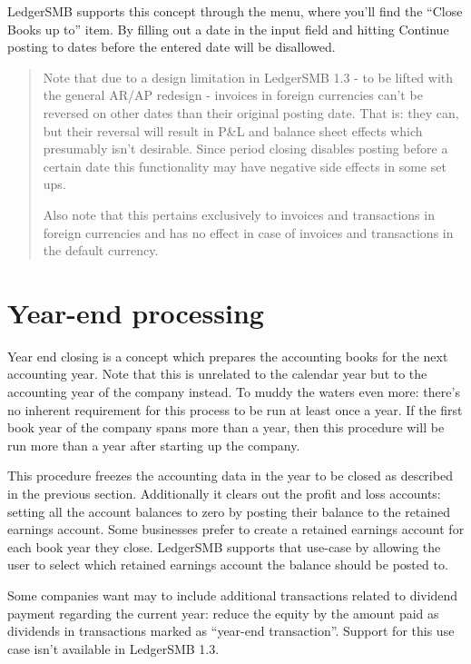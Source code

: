 LedgerSMB supports this concept through the 
menu, where you'll find the ``Close Books up to'' item. By filling out a date
in the input field and hitting Continue posting to dates before the entered
date will be disallowed.


\begin{quote}
Note that due to a design limitation in LedgerSMB 1.3 - to be lifted with the
general AR/AP redesign - invoices in foreign currencies can't be reversed on
other dates than their original posting date. That is: they can, but their
reversal will result in P\&L and balance sheet effects which presumably isn't
desirable. Since period closing disables posting before a certain date this
functionality may have negative side effects in some set ups.

Also note that this pertains exclusively to invoices and transactions in foreign
currencies and has no effect in case of invoices and transactions in the default
currency.
\end{quote}

\section{Year-end processing}
\label{sec-business-processes-accounting-year-end-processing}

Year end closing is a concept which prepares the accounting books for the next
accounting year. Note that this is unrelated to the calendar year but to the
accounting year of the company instead. To muddy the waters even more: there's
no inherent requirement for this process to be run at least once a year. If the
first book year of the company spans more than a year, then this procedure will
be run more than a year after starting up the company.

This procedure freezes the accounting data in the year to be closed as described
in the previous section. Additionally it clears out the profit and loss accounts:
setting all the account
balances to zero by posting their balance to the retained earnings account. Some
businesses prefer to create a retained earnings account for each book year they
close. LedgerSMB supports that use-case by allowing the user to select which
retained earnings account the balance should be posted to.

Some companies want may to include additional transactions related to dividend
payment regarding the current year: reduce the equity by the amount paid as
dividends in transactions marked as ``year-end transaction''. Support
for this use case isn't available in LedgerSMB 1.3.

